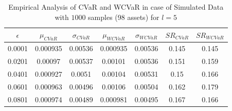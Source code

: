 \documentclass[12pt]{article}
\numberwithin{equation}{section}
\begin{document}
\begin{table}[!h]
    \centering
    \captionsetup{justification=centering}

   \begin{tabular}{||c|c|c|c|c|c|c||}
   \hline
  
$\epsilon$ & $\mu_{CVaR}$ & $\sigma_{CVaR}$ & $\mu_{WCVaR}$ & $\sigma_{WCVaR}$ & $SR_{CVaR}$ & $SR_{WCVaR}$\\
  
  \hline
0.0001 & 0.000935 & 0.00536 & 0.000935 & 0.00536 & 0.145 & 0.145 \\
0.0201 & 0.00097 & 0.00537 & 0.00101 & 0.00536 & 0.151 & 0.159 \\
0.0401 & 0.000927 & 0.0051 & 0.00104 & 0.00531 & 0.15 & 0.166 \\
0.0601 & 0.000963 & 0.00496 & 0.00106 & 0.00504 & 0.162 & 0.179 \\
0.0801 & 0.000974 & 0.00489 & 0.000981 & 0.00495 & 0.167 & 0.166 \\
  \hline
\end{tabular}
    \caption{Empirical Analysis of CVaR and WCVaR in case of Simulated Data with $1000$ samples (98 assets) for $l=5$}
    \label{tab:6.6}
\end{table}
\end{document}
